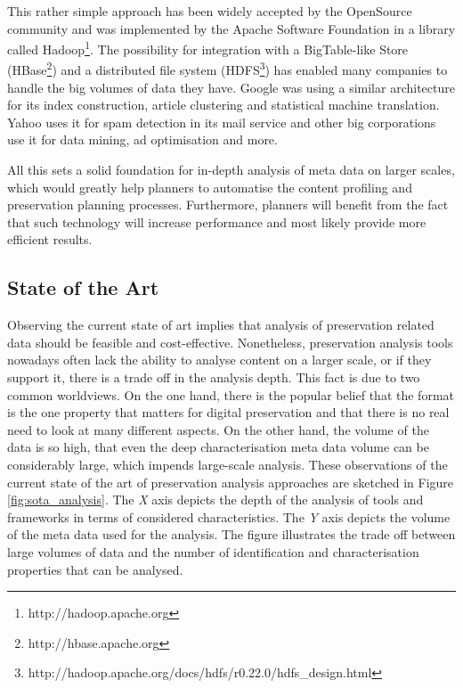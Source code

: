 This rather simple approach has been widely accepted by the OpenSource community and was implemented by the Apache Software Foundation in a library called Hadoop\footnote{http://hadoop.apache.org}. The possibility for integration with a BigTable-like Store \cite{Chang:2008:BDS:1365815.1365816} (HBase\footnote{http://hbase.apache.org}) and a distributed file system (HDFS\footnote{http://hadoop.apache.org/docs/hdfs/r0.22.0/hdfs\_design.html}) has enabled many companies to handle the big volumes of data they have. Google was using a similar architecture for its index construction, article clustering and statistical machine translation. Yahoo uses it for spam detection in its mail service and other big corporations use it for data mining, ad optimisation and more.

All this sets a solid foundation for in-depth analysis of meta data on larger scales, which would greatly help planners to automatise the content profiling and preservation planning processes. Furthermore, planners will benefit from the fact that such technology will increase performance and most likely provide more efficient results.

\subsection{State of the Art}
Observing the current state of art implies that analysis of preservation related data should be feasible and cost-effective. Nonetheless, preservation analysis tools nowadays often lack the ability to analyse content on a larger scale, or if they support it, there is a trade off in the analysis depth. This fact is due to two common worldviews. On the one hand, there is the popular belief that the format is the one property that matters for digital preservation \cite{citeulike:8904907} and that there is no real need to look at many different aspects. On the other hand, the volume of the data is so high, that even the deep characterisation meta data volume can be considerably large, which impends large-scale analysis. These observations of the current state of the art of preservation analysis approaches are sketched in Figure \ref{fig:sota_analysis}. 
The \textit{X} axis depicts the depth of the analysis of tools and frameworks in terms of considered characteristics.
The \textit{Y} axis depicts the volume of the meta data used for the analysis. The figure illustrates the trade off between large volumes of data and the number of identification and characterisation properties that can be analysed.

